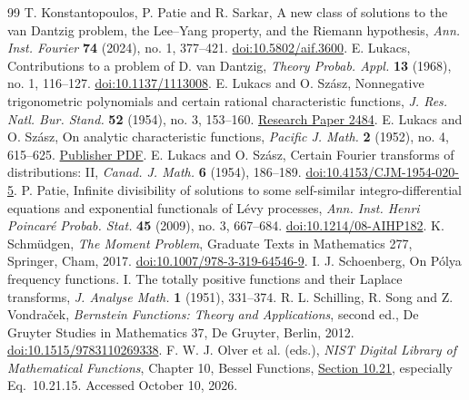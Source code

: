\documentclass[11pt,twoside]{article}
\theoremstyle{journalplain}
\numberwithin{equation}{section}
\theoremstyle{journaldefinition}
\begin{document}
\clearpage
\begin{thebibliography}{99}
 T. Konstantopoulos, P. Patie and R. Sarkar, A new class of solutions to the van Dantzig problem, the Lee--Yang property, and the Riemann hypothesis, \emph{Ann. Inst. Fourier} \textbf{74} (2024), no. 1, 377--421. \href{https://doi.org/10.5802/aif.3600}{doi:10.5802/aif.3600}.
 E. Lukacs, Contributions to a problem of D. van Dantzig, \emph{Theory Probab. Appl.} \textbf{13} (1968), no. 1, 116--127. \href{https://doi.org/10.1137/1113008}{doi:10.1137/1113008}.
 E. Lukacs and O. Sz\'asz, Nonnegative trigonometric polynomials and certain rational characteristic functions, \emph{J. Res. Natl. Bur. Stand.} \textbf{52} (1954), no. 3, 153--160. \href{https://nvlpubs.nist.gov/nistpubs/jres/52/jresv52n3p153_A1b.pdf}{Research Paper 2484}.
 E. Lukacs and O. Sz\'asz, On analytic characteristic functions, \emph{Pacific J. Math.} \textbf{2} (1952), no. 4, 615--625. \href{https://msp.org/pjm/1952/2-4/pjm-v2-n4-p08-p.pdf}{Publisher PDF}.
 E. Lukacs and O. Sz\'asz, Certain Fourier transforms of distributions: II, \emph{Canad. J. Math.} \textbf{6} (1954), 186--189. \href{https://doi.org/10.4153/CJM-1954-020-5}{doi:10.4153/CJM-1954-020-5}.
 P. Patie, Infinite divisibility of solutions to some self-similar integro-differential equations and exponential functionals of L\'evy processes, \emph{Ann. Inst. Henri Poincar\'e Probab. Stat.} \textbf{45} (2009), no. 3, 667--684. \href{https://doi.org/10.1214/08-AIHP182}{doi:10.1214/08-AIHP182}.
 K. Schm\"udgen, \emph{The Moment Problem}, Graduate Texts in Mathematics 277, Springer, Cham, 2017. \href{https://doi.org/10.1007/978-3-319-64546-9}{doi:10.1007/978-3-319-64546-9}.
 I. J. Schoenberg, On P\'olya frequency functions. I. The totally positive functions and their Laplace transforms, \emph{J. Analyse Math.} \textbf{1} (1951), 331--374.
 R. L. Schilling, R. Song and Z. Vondra\v cek, \emph{Bernstein Functions: Theory and Applications}, second ed., De Gruyter Studies in Mathematics 37, De Gruyter, Berlin, 2012. \href{https://doi.org/10.1515/9783110269338}{doi:10.1515/9783110269338}.
 F. W. J. Olver et al. (eds.), \emph{NIST Digital Library of Mathematical Functions}, Chapter 10, Bessel Functions, \href{https://dlmf.nist.gov/10.21}{Section 10.21}, especially Eq.~10.21.15. Accessed October 10, 2026.
\end{thebibliography}
\end{document}
